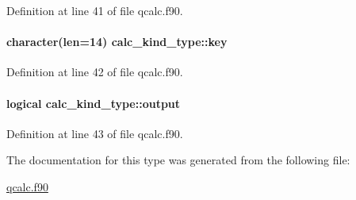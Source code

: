 Definition at line 41 of file qcalc.\-f90.

\hypertarget{structcalc__kind__type_a599466b5a5180588df96533095eb465f}{
\paragraph[{key}]{\setlength{\rightskip}{0pt plus 5cm}character(len=14) calc\-\_\-kind\-\_\-type\-::key}}\label{structcalc__kind__type_a599466b5a5180588df96533095eb465f}


Definition at line 42 of file qcalc.\-f90.

\hypertarget{structcalc__kind__type_a71d007604eeaa1cbddfa68dd79c8f2ec}{
\paragraph[{output}]{\setlength{\rightskip}{0pt plus 5cm}logical calc\-\_\-kind\-\_\-type\-::output}}\label{structcalc__kind__type_a71d007604eeaa1cbddfa68dd79c8f2ec}


Definition at line 43 of file qcalc.\-f90.



The documentation for this type was generated from the following file\-:\begin{DoxyCompactItemize}
\item 
\hyperlink{qcalc_8f90}{qcalc.\-f90}\end{DoxyCompactItemize}
